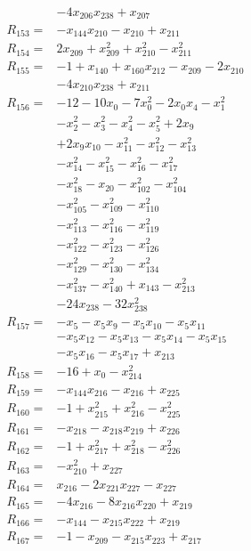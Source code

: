 \begin{align*}
&-4x_{206}x_{238} +x_{207}\\[3pt]
R_{153}={}&-x_{144}x_{210} -x_{210} +x_{211}\\[3pt]
R_{154}={}&2x_{209} +x_{209}^{2} +x_{210}^{2} -x_{211}^{2}\\[3pt]
R_{155}={}&-1 +x_{140} +x_{160}x_{212} -x_{209} -2x_{210}\\
&-4x_{210}x_{238} +x_{211}\\[3pt]
R_{156}={}&-12 -10x_{0} -7x_{0}^{2} -2x_{0}x_{4} -x_{1}^{2}\\
&-x_{2}^{2} -x_{3}^{2} -x_{4}^{2} -x_{5}^{2} +2x_{9}\\
&+2x_{9}x_{10} -x_{11}^{2} -x_{12}^{2} -x_{13}^{2}\\
&-x_{14}^{2} -x_{15}^{2} -x_{16}^{2} -x_{17}^{2}\\
&-x_{18}^{2} -x_{20} -x_{102}^{2} -x_{104}^{2}\\
&-x_{105}^{2} -x_{109}^{2} -x_{110}^{2}\\
&-x_{113}^{2} -x_{116}^{2} -x_{119}^{2}\\
&-x_{122}^{2} -x_{123}^{2} -x_{126}^{2}\\
&-x_{129}^{2} -x_{130}^{2} -x_{134}^{2}\\
&-x_{137}^{2} -x_{140}^{2} +x_{143} -x_{213}^{2}\\
&-24x_{238} -32x_{238}^{2}\\[3pt]
R_{157}={}&-x_{5} -x_{5}x_{9} -x_{5}x_{10} -x_{5}x_{11}\\
&-x_{5}x_{12} -x_{5}x_{13} -x_{5}x_{14} -x_{5}x_{15}\\
&-x_{5}x_{16} -x_{5}x_{17} +x_{213}\\[3pt]
R_{158}={}&-16 +x_{0} -x_{214}^{2}\\[3pt]
R_{159}={}&-x_{144}x_{216} -x_{216} +x_{225}\\[3pt]
R_{160}={}&-1 +x_{215}^{2} +x_{216}^{2} -x_{225}^{2}\\[3pt]
R_{161}={}&-x_{218} -x_{218}x_{219} +x_{226}\\[3pt]
R_{162}={}&-1 +x_{217}^{2} +x_{218}^{2} -x_{226}^{2}\\[3pt]
R_{163}={}&-x_{210}^{2} +x_{227}\\[3pt]
R_{164}={}&x_{216} -2x_{221}x_{227} -x_{227}\\[3pt]
R_{165}={}&-4x_{216} -8x_{216}x_{220} +x_{219}\\[3pt]
R_{166}={}&-x_{144} -x_{215}x_{222} +x_{219}\\[3pt]
R_{167}={}&-1 -x_{209} -x_{215}x_{223} +x_{217}\\[3pt]

\end{align*}
